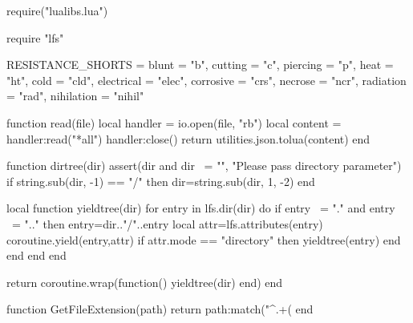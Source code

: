 \begin{luacode}
	require("lualibs.lua")

    require "lfs"

	RESISTANCE_SHORTS = {blunt = "b", cutting = "c", piercing = "p", heat = "ht", cold = "cld", electrical = "elec", corrosive = "crs", necrose = "ncr", radiation = "rad", nihilation = "nihil"}

	function read(file)
		local handler = io.open(file, "rb")
		local content = handler:read("*all")
		handler:close()
		return utilities.json.tolua(content)
	end

    function dirtree(dir)
        assert(dir and dir ~= "", "Please pass directory parameter")
        if string.sub(dir, -1) == "/" then
            dir=string.sub(dir, 1, -2)
        end

        local function yieldtree(dir)
            for entry in lfs.dir(dir) do
                if entry ~= "." and entry ~= ".." then
                    entry=dir.."/"..entry
                    local attr=lfs.attributes(entry)
                    coroutine.yield(entry,attr)
                    if attr.mode == "directory" then
                        yieldtree(entry)
                    end
                end
            end
        end

        return coroutine.wrap(function() yieldtree(dir) end)
    end

    function GetFileExtension(path)
        return path:match("^.+(%
    end
\end{luacode}